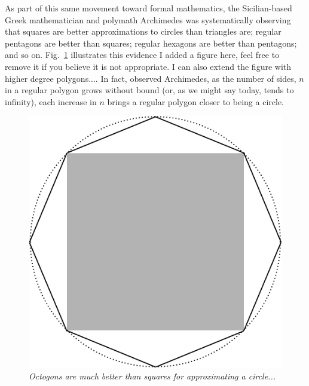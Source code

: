 As part of this same movement toward formal mathematics, the
Sicilian-based Greek mathematician and polymath Archimedes
%
was systematically observing that squares are better approximations to
circles than triangles are; regular pentagons are better than squares;
regular hexagons are better than pentagons; and so on.  
Fig.~\ref{fig:approxcircle} illustrates this evidence {\Denis I added a figure here, feel free to remove it if you believe it is not appropriate.
I can also extend the figure with higher degree polygons...}.
In fact,
observed Archimedes, as the number of sides, $n$ in a regular polygon
grows without bound (or, as we might say today, tends to infinity),
each increase in $n$ brings a regular polygon closer to being a circle.  
\begin{figure}[htb]
\begin{center}
       \includegraphics[scale=0.25]{FiguresArithmetic/ApproxCircle}
\caption{{\it Octogons are much better than squares for approximating a circle...}
\label{fig:approxcircle}}
\end{center}
\end{figure}


